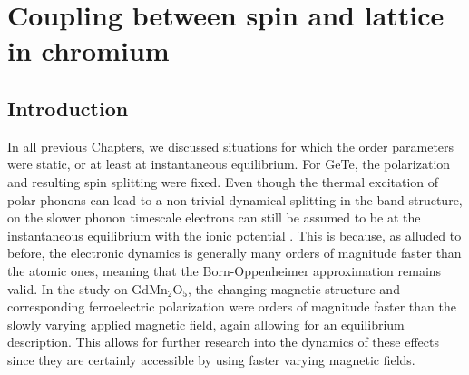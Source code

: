 \chapter{Coupling between spin and lattice in chromium \label{ch:CrSDW}}
\section{Introduction}
In all previous Chapters, we discussed situations for which the order parameters were static, or at least at instantaneous equilibrium.
For GeTe, the polarization and resulting spin splitting were fixed.
Even though the thermal excitation of polar phonons can lead to a non-trivial dynamical splitting in the band structure, on the slower phonon timescale electrons can still be assumed to be at the instantaneous equilibrium with the ionic potential \cite{Monserrat2017}.
This is because, as alluded to before, the electronic dynamics is generally many orders of magnitude faster than the atomic ones, meaning that the Born-Oppenheimer approximation remains valid.
In the study on GdMn$_2$O$_5$, the changing magnetic structure and corresponding ferroelectric polarization were orders of magnitude faster than the slowly varying applied magnetic field, again allowing for an equilibrium description.
This allows for further research into the dynamics of these effects since they are certainly accessible by using faster varying magnetic fields.

